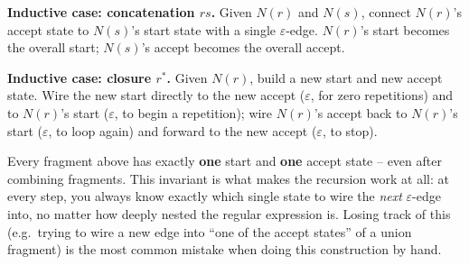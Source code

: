 \documentclass[full-course-notes.tex]{subfiles}
\begin{document}
\textbf{Inductive case: concatenation $rs$.} Given $N(r)$ and $N(s)$, connect $N(r)$'s accept
state to $N(s)$'s start state with a single $\varepsilon$-edge. $N(r)$'s start becomes the
overall start; $N(s)$'s accept becomes the overall accept.
\begin{center}
\end{center}

\textbf{Inductive case: closure $r^{*}$.} Given $N(r)$, build a new start and new accept state.
Wire the new start directly to the new accept ($\varepsilon$, for zero repetitions) and to
$N(r)$'s start ($\varepsilon$, to begin a repetition); wire $N(r)$'s accept back to $N(r)$'s
start ($\varepsilon$, to loop again) and forward to the new accept ($\varepsilon$, to stop).
\begin{center}
\end{center}

\begin{examfocus}
Every fragment above has exactly \textbf{one} start and \textbf{one} accept state -- even after
combining fragments. This invariant is what makes the recursion work at all: at every step, you
always know exactly which single state to wire the \emph{next} $\varepsilon$-edge into, no
matter how deeply nested the regular expression is. Losing track of this (e.g.\ trying to wire
a new edge into ``one of the accept states'' of a union fragment) is the most common mistake
when doing this construction by hand.
\end{examfocus}
\end{document}
